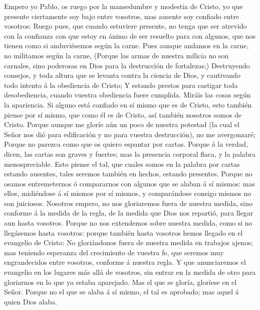  Empero yo Pablo, os ruego por la mansedumbre y modestia
de Cristo, yo que presente ciertamente soy bajo entre vosotros, mas
ausente soy confiado entre vosotros:  Ruego pues, que
cuando estuviere presente, no tenga que ser atrevido con la confianza
con que estoy en ánimo de ser resuelto para con algunos, que nos tienen
como si anduviésemos según la carne.  Pues aunque andamos
en la carne, no militamos según la carne,  (Porque las
armas de nuestra milicia no son carnales, sino poderosas en Dios para la
destrucción de fortalezas;)  Destruyendo consejos, y toda
altura que se levanta contra la ciencia de Dios, y cautivando todo
intento á la obediencia de Cristo;  Y estando prestos para
castigar toda desobediencia, cuando vuestra obediencia fuere cumplida.
 Miráis las cosas según la apariencia. Si alguno está
confiado en sí mismo que es de Cristo, esto también piense por sí mismo,
que como él es de Cristo, así también nosotros somos de Cristo.
 Porque aunque me gloríe aún un poco de nuestra potestad
(la cual el Señor nos dió para edificación y no para vuestra
destrucción), no me avergonzaré;  Porque no parezca como
que os quiero espantar por cartas.  Porque á la verdad,
dicen, las cartas son graves y fuertes; mas la presencia corporal flaca,
y la palabra menospreciable.  Esto piense el tal, que
cuales somos en la palabra por cartas estando ausentes, tales seremos
también en hechos, estando presentes.  Porque no osamos
entremeternos ó compararnos con algunos que se alaban á sí mismos: mas
ellos, midiéndose á sí mismos por sí mismos, y comparándose consigo
mismos no son juiciosos.  Nosotros empero, no nos
gloriaremos fuera de nuestra medida, sino conforme á la medida de la
regla, de la medida que Dios nos repartió, para llegar aun hasta
vosotros.  Porque no nos extendemos sobre nuestra medida,
como si no llegásemos hasta vosotros: porque también hasta vosotros
hemos llegado en el evangelio de Cristo:  No gloriándonos
fuera de nuestra medida en trabajos ajenos; mas teniendo esperanza del
crecimiento de vuestra fe, que seremos muy engrandecidos entre vosotros,
conforme á nuestra regla.  Y que anunciaremos el
evangelio en los lugares más allá de vosotros, sin entrar en la medida
de otro para gloriarnos en lo que ya estaba aparejado. 
Mas el que se gloría, gloríese en el Señor.  Porque no el
que se alaba á sí mismo, el tal es aprobado; mas aquel á quien Dios
alaba.

